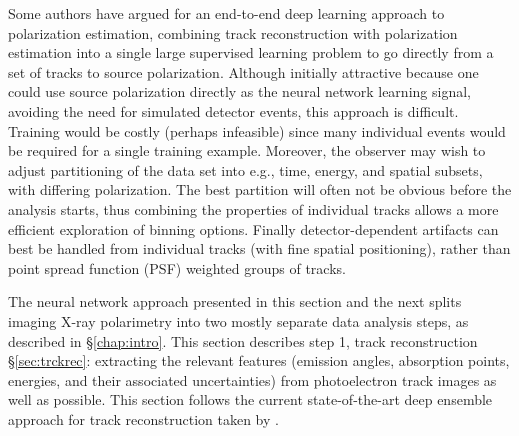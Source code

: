 Some authors \citep{kitaguchi_convolutional_2019} have argued for an end-to-end deep learning approach to polarization estimation, combining track reconstruction with polarization estimation into a single large supervised learning problem to go directly from a set of tracks to source polarization. Although initially attractive because one could use source polarization directly as the neural network learning signal, avoiding the need for simulated detector events, this approach is difficult. Training would be costly (perhaps infeasible) since many individual events would be required for a single training example. Moreover, the observer may wish to adjust partitioning of the data set into e.g., time, energy, and spatial subsets, with differing polarization. The best partition will often not be obvious before the analysis starts, thus combining the properties of individual tracks allows a more efficient exploration of binning options. Finally detector-dependent artifacts can best be handled from individual tracks (with fine spatial positioning), rather than point spread function (PSF) weighted groups of tracks.

The neural network approach presented in this section and the next splits imaging X-ray polarimetry into two mostly separate data analysis steps, as described in \S\ref{chap:intro}. This section describes step 1, track reconstruction \S\ref{sec:trckrec}: extracting the relevant features (emission angles, absorption points, energies, and their associated uncertainties) from photoelectron track images as well as possible. This section follows the current state-of-the-art deep ensemble approach for track reconstruction taken by \citet{peirson_deep_2021, peirson_towards_2021}.

